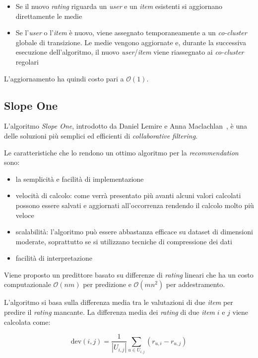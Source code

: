 \begin{itemize}
  \item Se il nuovo \textit{rating} riguarda un \textit{user} e un \textit{item} esistenti si aggiornano direttamente le medie
  \item Se l'\textit{user} o l'\textit{item} è nuovo, viene assegnato temporaneamente a un \textit{co-cluster} globale di transizione. Le medie vengono aggiornate e, durante la successiva esecuzione dell'algoritmo, il nuovo \textit{user}/\textit{item} viene riassegnato ai \textit{co-cluster} regolari
\end{itemize}

L'aggiornamento ha quindi costo pari a $\mathcal{O}(1)$.

\subsection{Slope One}\label{slopeone}

L'algoritmo \textit{Slope One}, introdotto da Daniel Lemire e Anna Maclachlan~\cite{SlopeOne}, è una delle soluzioni più semplici ed efficienti di \textit{collaborative filtering}.

Le caratteristiche che lo rendono un ottimo algoritmo per la \textit{recommendation} sono:
\begin{itemize}
    \item la semplicità e facilità di implementazione
    \item velocità di calcolo: come verrà presentato più avanti alcuni valori calcolati possono essere salvati e aggiornati all'occorrenza rendendo il calcolo molto più veloce
    \item scalabilità: l'algoritmo può essere abbastanza efficace su dataset di dimensioni moderate, soprattutto se si utilizzano tecniche di compressione dei dati
    \item facilità di interpretazione
\end{itemize}

Viene proposto un predittore basato su differenze di \textit{rating} lineari che ha un costo computazionale $\mathcal{O}(nm)$ per predizione e $\mathcal{O}(mn^2)$ per addestramento.

L'algoritmo si basa sulla differenza media tra le valutazioni di due \textit{item} per predire il \textit{rating} mancante. La differenza media dei \textit{rating} di due \textit{item} $i$ e $j$ viene calcolata come:

\[
    \text{dev}(i, j) = \frac{1}{|U_{i,j}|} \sum\limits_{u \in U_{i,j}} (r_{u,i} - r_{u,j})
\]

